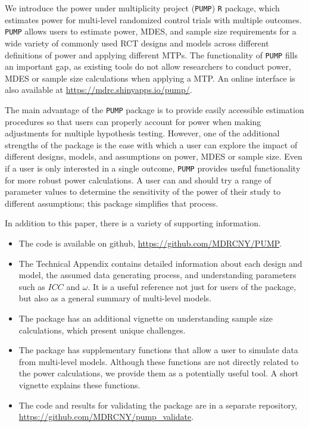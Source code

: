 \documentclass[
]{jss}
\providecommand{\tightlist}{%
  \setlength{\itemsep}{0pt}\setlength{\parskip}{0pt}}
\begin{document}
We introduce the power under multiplicity project (\texttt{PUMP})
\texttt{R} package, which estimates power for multi-level randomized
control trials with multiple outcomes. \texttt{PUMP} allows users to
estimate power, MDES, and sample size requirements for a wide variety of
commonly used RCT designs and models across different definitions of
power and applying different MTPs. The functionality of \texttt{PUMP}
fills an important gap, as existing tools do not allow researchers to
conduct power, MDES or sample size calculations when applying a MTP. An
online interface is also available at
\url{https://mdrc.shinyapps.io/pump/}.

The main advantage of the \texttt{PUMP} package is to provide easily
accessible estimation procedures so that users can properly account for
power when making adjustments for multiple hypothesis testing. However,
one of the additional strengths of the package is the ease with which a
user can explore the impact of different designs, models, and
assumptions on power, MDES or sample size. Even if a user is only
interested in a single outcome, \texttt{PUMP} provides useful
functionality for more robust power calculations. A user can and should
try a range of parameter values to determine the sensitivity of the
power of their study to different assumptions; this package simplifies
that process.

In addition to this paper, there is a variety of supporting information.

\begin{itemize}
\tightlist
\item
  The code is available on github, \url{https://github.com/MDRCNY/PUMP}.
\item
  The Technical Appendix contains detailed information about each design
  and model, the assumed data generating process, and understanding
  parameters such as \(ICC\) and \(\omega\). It is a useful reference
  not just for users of the package, but also as a general summary of
  multi-level models.
\item
  The package has an additional vignette on understanding sample size
  calculations, which present unique challenges.
\item
  The package has supplementary functions that allow a user to simulate
  data from multi-level models. Although these functions are not
  directly related to the power calculations, we provide them as a
  potentially useful tool. A short vignette explains these functions.
\item
  The code and results for validating the package are in a separate
  repository, \url{https://github.com/MDRCNY/pump_validate}.
\end{itemize}
\end{document}
